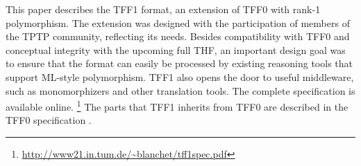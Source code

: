 This paper describes the TFF1
format, an extension of TFF0 with rank-1 polymorphism.
The extension was designed with the participation of members of the TPTP
community, reflecting its needs.
Besides compatibility with TFF0 and conceptual integrity with the upcoming full
THF, an important design goal was to ensure that the format can easily be
processed by existing reasoning tools that support ML-style polymorphism. TFF1
also opens the door to useful middleware, such as monomorphizers and other
translation tools. The complete specification is available online.%
\footnote{\url{http://www21.in.tum.de/~blanchet/tff1spec.pdf}}
%
The parts that TFF1 inherits from TFF0
are described in the TFF0 specification \cite{sutcliffe-et-al-2012-tff0}.
